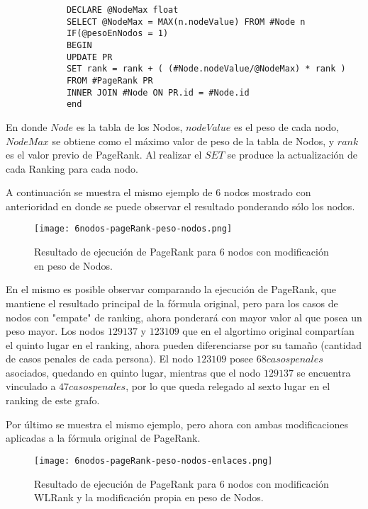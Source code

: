 \begin{scriptsize}{1}
	\tiny{
		\begin{verbatim}
			DECLARE @NodeMax float
			SELECT @NodeMax = MAX(n.nodeValue) FROM #Node n			
			IF(@pesoEnNodos = 1)
			BEGIN
			UPDATE PR 
			SET rank = rank + ( (#Node.nodeValue/@NodeMax) * rank )
			FROM #PageRank PR
			INNER JOIN #Node ON PR.id = #Node.id
			end
		\end{verbatim}
	}
\end{scriptsize}


En donde $Node$ es la tabla de los Nodos, $nodeValue$ es el peso de cada nodo, $NodeMax$ se obtiene como el máximo valor de peso de la tabla de Nodos, y $rank$ es el valor previo de PageRank. Al realizar el $SET$ se produce la actualización de cada Ranking para cada nodo. 

A continuación se muestra el mismo ejemplo de 6 nodos mostrado con anterioridad en donde se puede observar el resultado ponderando sólo los nodos.

\begin{figure}
	\centering
	\texttt{[image: 6nodos-pageRank-peso-nodos.png]}
	\caption{Resultado de ejecución de PageRank para 6 nodos con modificación en peso de Nodos.} 
	\label{fig:6nodos-pageRank-peso-nodos}
\end{figure}

En el mismo es posible observar comparando la ejecución de PageRank, que mantiene el resultado principal de la fórmula original, pero para los casos de nodos con "empate" de ranking, ahora ponderará con mayor valor al que posea un peso mayor. Los nodos $129137$ y $123109$ que en el algortimo original compartían el quinto lugar en el ranking, ahora pueden diferenciarse por su tamaño (cantidad de casos penales de cada persona). El nodo $123109$ posee $68 casos penales$ asociados, quedando en quinto lugar, mientras que el nodo $129137$ se encuentra vinculado a $47 casos penales$, por lo que queda relegado al sexto lugar en el ranking de este grafo.

Por último se muestra el mismo ejemplo, pero ahora con ambas modificaciones aplicadas a la fórmula original de PageRank.

\begin{figure}
	\centering
	\texttt{[image: 6nodos-pageRank-peso-nodos-enlaces.png]}
	\caption{Resultado de ejecución de PageRank para 6 nodos con modificación WLRank y la modificación propia en peso de Nodos.} 
	\label{fig:6nodos-pageRank-peso-nodos-enlaces}
\end{figure}

